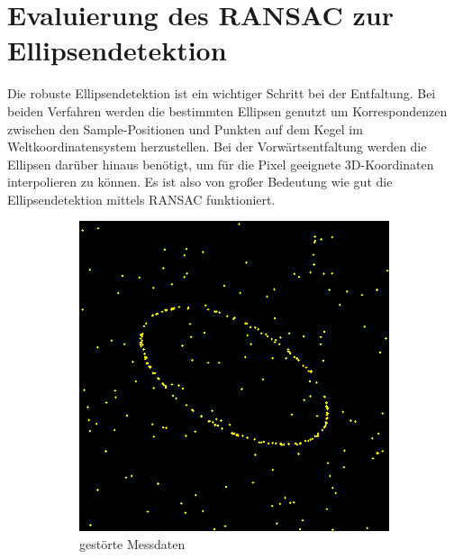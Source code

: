 \section{Evaluierung des RANSAC zur Ellipsendetektion}
Die robuste Ellipsendetektion ist ein wichtiger Schritt bei der Entfaltung. Bei beiden Verfahren werden die bestimmten Ellipsen genutzt um Korrespondenzen zwischen den Sample-Positionen und Punkten auf dem Kegel im Weltkoordinatensystem herzustellen. Bei der Vorwärtsentfaltung werden die Ellipsen darüber hinaus benötigt, um für die Pixel geeignete 3D-Koordinaten interpolieren zu können. Es ist also von großer Bedeutung wie gut die Ellipsendetektion mittels RANSAC funktioniert.  


\begin{figure}[!htb]
	\centering
	\begin{subfigure}{.5\textwidth}
		\centering
		\includegraphics[width=.9\textwidth]{images/ransac50_0.png}
		\caption{gestörte Messdaten}
	\end{subfigure}%
	\begin{subfigure}{.5\textwidth}
		\centering

\end{subfigure}
\end{figure}
